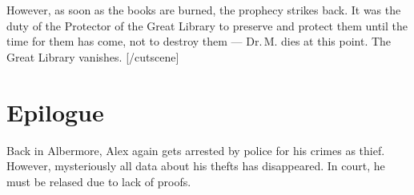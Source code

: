\documentclass{gd-document}
\newcommand\DrM{Dr.\,M.\xspace}
\begin{document}
However, as soon as the books are burned, the prophecy strikes
back. It was the duty of the Protector of the Great Library to
preserve and protect them until the time for them has come, not to
destroy them — \DrM dies at this point. The Great Library vanishes.
[/cutscene]

\section{Epilogue}

Back in Albermore, Alex again gets arrested by police for his crimes
as thief. However, mysteriously all data about his thefts has
disappeared. In court, he must be relased due to lack of proofs.
\end{document}
